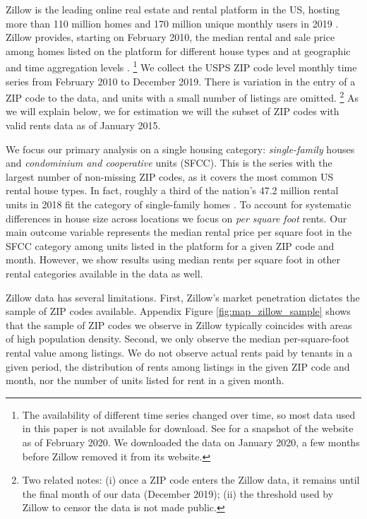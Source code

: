 Zillow is the leading online real estate and rental platform in the US, hosting
more than 110 million homes and 170 million unique monthly users in 2019 
\parencite{ZillowFacts}.
Zillow provides, starting on February 2010, the median rental and sale price among 
homes listed on the platform for different house types and at geographic and 
time aggregation levels \parencite{ZillowData}.%
\footnote{The availability of different time series changed over time, so most
data used in this paper is not available for download.
See \textcite{ZillowDataArchive} for a snapshot of the website as of 
February 2020.
We downloaded the data on January 2020, a few months before Zillow removed it 
from its website.} 
We collect the USPS ZIP code level monthly time series from February 2010 to 
December 2019. 
There is variation in the entry of a ZIP code to the data, and units with a small 
number of listings are omitted.%
\footnote{Two related notes:
(i) once a ZIP code enters the Zillow data, it remains until the final month 
of our data (December 2019);
(ii) the threshold used by Zillow to censor the data is not made public.}
As we will explain below, we for estimation we will the subset of ZIP codes
with valid rents data as of January 2015.

We focus our primary analysis on a single housing category:
\textit{single-family} houses and \textit{condominium and cooperative} units (SFCC).
This is the series with the largest number of non-missing ZIP codes, as it 
covers the most common US rental house types.
In fact, roughly a third of the nation's 47.2 million rental units in 2018 fit 
the category of single-family homes \parencite{Fernald2020}.
To account for systematic differences in house size across locations we focus 
on \textit{per square foot} rents.
Our main outcome variable represents the median rental price per square foot in 
the SFCC category among units listed in the platform for a given ZIP code and 
month.
However, we show results using median rents per square foot in other rental 
categories available in the data as well.

Zillow data has several limitations.
First, Zillow's market penetration dictates the sample of ZIP codes available.
Appendix Figure \ref{fig:map_zillow_sample} shows that the sample of ZIP codes
we observe in Zillow typically coincides with areas of high population density.
Second, we only observe the median per-square-foot rental value among listings.
We do not observe actual rents paid by tenants in a given period, 
the distribution of rents among listings in the given ZIP code and month, nor
the number of units listed for rent in a given month.

